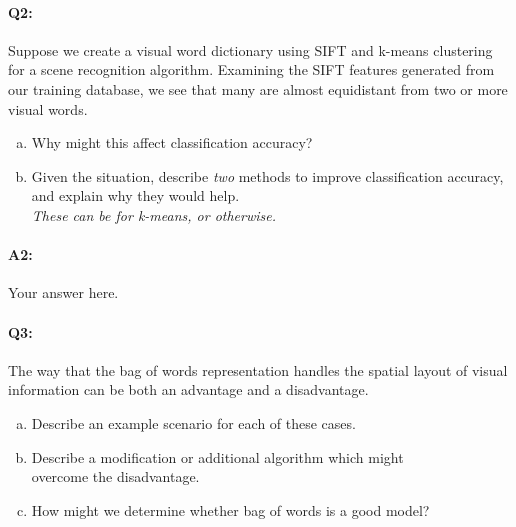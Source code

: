 \pagebreak
\paragraph{Q2:} Suppose we create a visual word dictionary using SIFT and k-means clustering for a scene recognition algorithm. Examining the SIFT features generated from our training database, we see that many are almost equidistant from two or more visual words. 
\begin{enumerate}[(a)]
    \item 
    Why might this affect classification accuracy?

    \item
    Given the situation, describe \emph{two} methods to improve classification accuracy, and explain why they would help.\\ 
    \emph{These can be for k-means, or otherwise.}

\end{enumerate}


\paragraph{A2:} Your answer here.








\pagebreak
\paragraph{Q3:} The way that the bag of words representation handles the spatial layout of visual information can be both an advantage and a disadvantage.
\begin{enumerate}[(a)]
\item Describe an example scenario for each of these cases.
\item Describe a modification or additional algorithm which might\\overcome the disadvantage.

\item How might we determine whether bag of words is a good model?
\end{enumerate}
